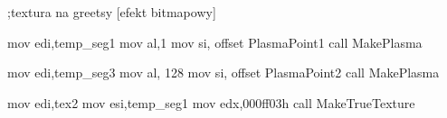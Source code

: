 ;textura na greetsy [efekt bitmapowy]

	mov   edi,temp_seg1
	mov   al,1
	mov   si, offset PlasmaPoint1
	call  MakePlasma

	mov   edi,temp_seg3
	mov   al, 128
	mov   si, offset PlasmaPoint2
	call  MakePlasma

	mov   edi,tex2
	mov   esi,temp_seg1
	mov   edx,000ff03h
	call  MakeTrueTexture
